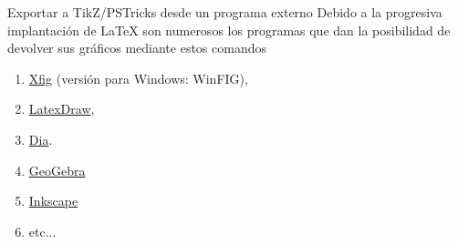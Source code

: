 \documentclass{beamer}
\begin{document}
\begin{frame}{Exportar a TikZ/PSTricks desde un programa externo}
Debido a la progresiva implantaci\'on de \LaTeX $ $  son  numerosos los programas que 
dan la posibilidad de devolver sus gr\'aficos mediante estos comandos 
\begin{enumerate}
\item \href{http://mcj.sourceforge.net}{Xfig} {\small (versi\'on para Windows: WinFIG)}, 
\item \href{http://latexdraw.sourceforge.net}{LatexDraw},
\item \href{http://dia-installer.de/index.html.en}{Dia}.
\item \href{http://www.geogebra.org/cms/}{GeoGebra}
\item  \href{https://Inkscape.org/en/}{Inkscape}
\item etc...
\end{enumerate}



\end{frame}
\end{document}
